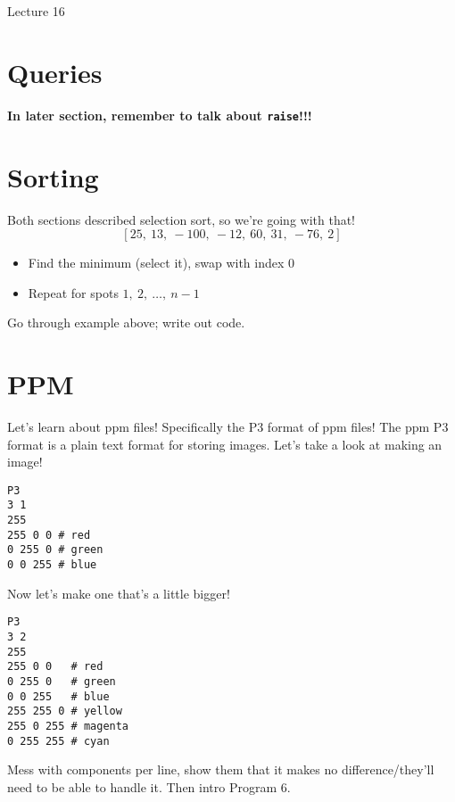 \documentclass[12pt]{article}
\begin{document}
\begin{center}
   \LARGE Lecture 16
\end{center}

\section*{Queries}

\textbf{In later section, remember to talk about \lstinline{raise}!!!}

\section{Sorting}

Both sections described selection sort, so we're going with that!
\[[25,\ 13,\ -100,\ -12,\ 60,\ 31,\ -76,\ 2]\]

\begin{itemize}
   \item Find the minimum (select it), swap with index 0
   \item Repeat for spots \(1,\ 2,\ \dots,\ n-1\)
\end{itemize}

\noindent
Go through example above; write out code.



\section{PPM}

Let's learn about ppm files!  Specifically the P3 format of ppm files!  The ppm
P3 format is a plain text format for storing images.  Let's take a look at
making an image!

\newpage

\begin{lstlisting}
P3
3 1
255
255 0 0 # red
0 255 0 # green
0 0 255 # blue
\end{lstlisting}

\noindent
Now let's make one that's a little bigger!

\begin{lstlisting}
P3
3 2
255
255 0 0   # red
0 255 0   # green
0 0 255   # blue
255 255 0 # yellow
255 0 255 # magenta
0 255 255 # cyan
\end{lstlisting}

\noindent
Mess with components per line, show them that it makes no difference/they'll
need to be able to handle it.  Then intro Program 6.
\end{document}
